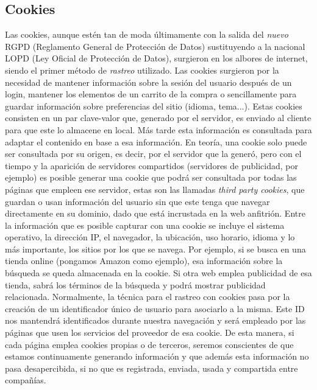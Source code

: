 \documentclass[12pt,a4paper,oneside]{book} %
\begin{document}
\subsection{Cookies}
Las cookies, aunque estén tan de moda últimamente con la salida del \textit{nuevo} RGPD \cite{rgpd} (Reglamento General de Protección de Datos) sustituyendo a la nacional LOPD (Ley Oficial de Protección de Datos), surgieron en los albores de internet, siendo el primer método de \textit{rastreo} utilizado. 
\newline \newline 
Las cookies surgieron por la necesidad de mantener información sobre la sesión del usuario después de un login, mantener los elementos de un carrito de la compra o sencillamente para guardar información sobre preferencias del sitio (idioma, tema...). 
\newline \newline 
Estas cookies consisten en un par clave-valor que, generado por el servidor, es enviado al cliente para que este lo almacene en local. Más tarde esta información es consultada para adaptar el contenido en base a esa información.  
\newline \newline
En teoría, una cookie solo puede ser consultada por su origen, es decir, por el servidor que la generó, pero con el tiempo y la aparición de servidores compartidos (servidores de publicidad, por ejemplo) es posible generar una cookie que podrá ser consultada por todas las páginas que empleen ese servidor, estas son las llamadas \textit{third party cookies}, que guardan o usan información del usuario sin que este tenga que navegar directamente en su dominio, dado que está incrustada en la web anfitrión. 
\newline \newline 
Entre la información que es posible capturar con una cookie se incluye el sistema operativo, la dirección IP, el navegador, la ubicación, uso horario, idioma y lo más importante, los sitios por los que se navega. Por ejemplo, si se busca en una tienda online (pongamos Amazon como ejemplo), esa información sobre la búsqueda se queda almacenada en la cookie. Si otra web emplea publicidad de esa tienda, sabrá los términos de la búsqueda y podrá mostrar publicidad relacionada. 
\newline \newline 
Normalmente, la técnica para el rastreo con cookies pasa por la creación de un identificador único de usuario para asociarlo a la misma. Este ID nos mantendrá identificados durante nuestra navegación y será empleado por las páginas que usen los servicios del proveedor de esa cookie. De esta manera, si cada página emplea cookies propias o de terceros, seremos conscientes de que estamos continuamente generando información y que además esta información no pasa desapercibida, si no que es registrada, enviada, usada y compartida entre compañías. 
\end{document}
